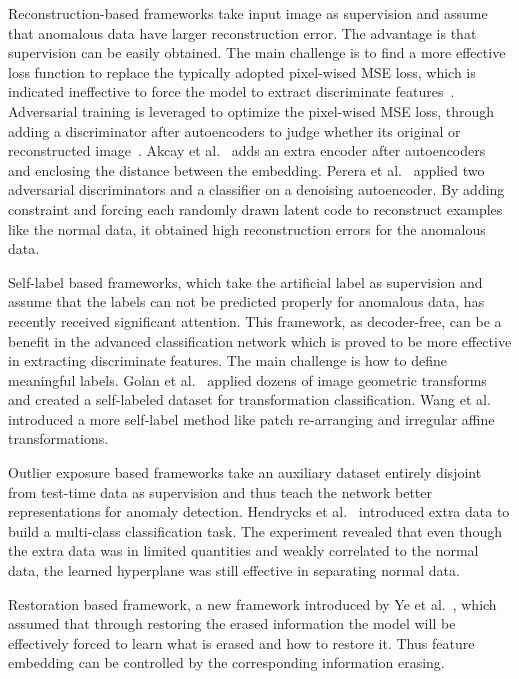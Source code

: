 \documentclass[journal]{IEEEtran}
\theoremstyle{remark}
\begin{document}
Reconstruction-based frameworks take input image as supervision and assume that anomalous data have larger reconstruction error. The advantage is that supervision can be easily obtained. The main challenge is to find a more effective loss function to replace the typically adopted pixel-wised MSE loss, which is indicated ineffective to force the model to extract discriminate features~\cite{SimilarityMetricAutoencoding,dosovitskiy2016generating}. 
Adversarial training is leveraged to optimize the pixel-wised MSE loss, through adding a discriminator after autoencoders to judge whether its original or reconstructed image~\cite{Sabokrou2018Adversarially,deecke2018anomaly}. Akcay et al.~\cite{Akcay2018} adds an extra encoder after autoencoders and enclosing the distance between the embedding. Perera et al.~\cite{OCGAN} applied two adversarial discriminators and a classifier on a denoising autoencoder. By adding constraint and forcing each randomly drawn latent code to reconstruct examples like the normal data, it obtained high reconstruction errors for the anomalous data.

Self-label based frameworks, which take the artificial label as supervision and assume that the labels can not be predicted properly for anomalous data, has recently received significant attention. This framework, as decoder-free, can be a benefit in the advanced classification network which is proved to be more effective in extracting discriminate features. The main challenge is how to define meaningful labels.
Golan et al.~\cite{golan2018deep} applied dozens of image geometric transforms and created a self-labeled dataset for transformation classification. Wang et al.~\cite{NipsEffective} introduced a more self-label method like patch re-arranging and irregular affine transformations. 

Outlier exposure based frameworks take an auxiliary dataset entirely disjoint from test-time data as supervision and thus teach the network better representations for anomaly detection.  Hendrycks et al.~\cite{hendrycks2018deep} introduced extra data to build a multi-class classification task. The experiment revealed that even though the extra data was in limited quantities and weakly correlated to the normal data, the learned hyperplane was still effective in separating normal data.

Restoration based framework, a new framework introduced by Ye et al.~\cite{fye2020ARNet}, which assumed that through restoring the erased information the model will be effectively forced to learn what is erased and how to restore it. Thus feature embedding can be controlled by the corresponding information erasing.
\end{document}
